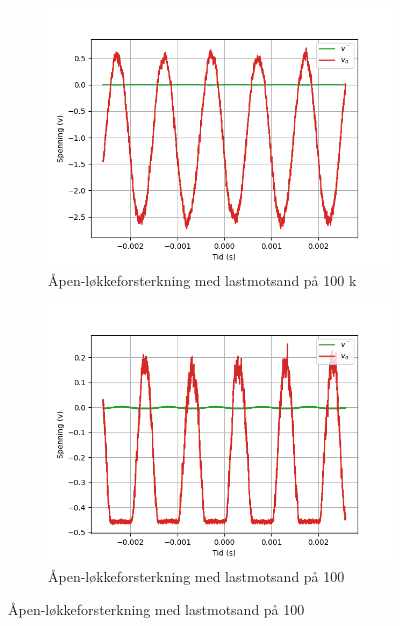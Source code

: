     \begin{figure}[!hbt]
        \centering
        \begin{subfigure}{.5\textwidth}
            \centering
            \includegraphics[width=1\linewidth]{./Images/03Research/åpenløkkeplain100kohm.png}
            \caption{Åpen-løkkeforsterkning med lastmotsand på 100 k\text{$\Omega$}}
            \label{fig:100k}
        \end{subfigure}%
        \begin{subfigure}{.5\textwidth}
            \centering
            \includegraphics[width=1\linewidth]{./Images/03Research/åpenløkkeplain100ohm.png}
            \caption{Åpen-løkkeforsterkning med lastmotsand på 100 \text{$\Omega$}}
            \label{fig:100}
        \end{subfigure}
    \end{figure}

